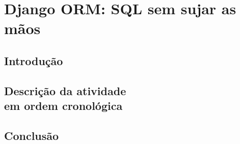 \documentclass[a4paper]{report}
\begin{document}
    \chapter[Django ORM]{Django ORM: SQL sem sujar as mãos}

        \section{Introdução}

        \section[Descrição atividade]{Descrição da atividade
        \\em ordem cronológica}

        \section{Conclusão}
\end{document}

